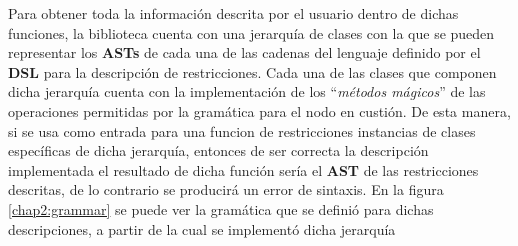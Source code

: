 Para obtener toda la información descrita por el usuario dentro de dichas funciones, la biblioteca cuenta con
una jerarquía de clases con la que se pueden representar los {\bf ASTs} de cada una de las cadenas del lenguaje definido
por el {\bf DSL} para la descripción de restricciones. Cada una de las clases que componen dicha jerarquía cuenta con
la implementación de los ``{\it métodos mágicos}'' de las operaciones permitidas por la gramática para el nodo en custión. De esta manera,
si se usa como entrada para una funcion de restricciones instancias de clases específicas de dicha jerarquía,
entonces de ser correcta la descripción implementada el resultado de dicha función sería el {\bf AST} de las restricciones
descritas, de lo contrario se producirá un error de sintaxis. En la figura \ref{chap2:grammar} se puede ver la gramática que se 
definió para dichas descripciones, a partir de la cual se implementó dicha jerarquía




